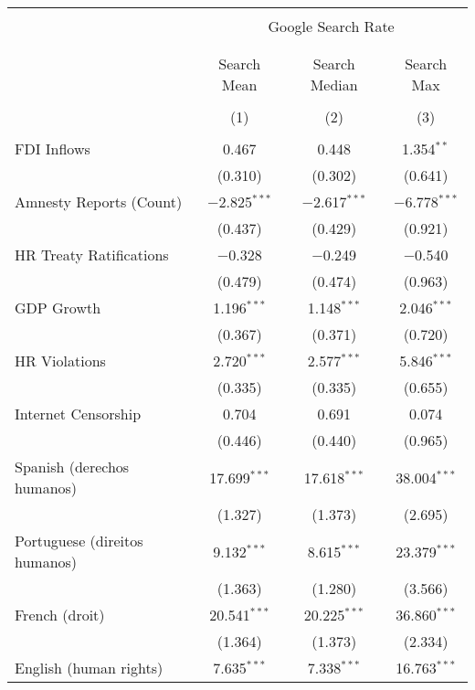 
\begin{table}[!htbp] \centering 
  \caption{} 
  \label{} 
\begin{tabular}{@{\extracolsep{5pt}}lccc} 
\\[-1.8ex]\hline 
\hline \\[-1.8ex] 
 & \multicolumn{3}{c}{Google Search Rate} \\ 
\cline{2-4} 
\\[-1.8ex] & \multicolumn{3}{c}{ } \\ 
 & Search Mean & Search Median & Search Max \\ 
\\[-1.8ex] & (1) & (2) & (3)\\ 
\hline \\[-1.8ex] 
 FDI Inflows & 0.467 & 0.448 & 1.354$^{**}$ \\ 
  & (0.310) & (0.302) & (0.641) \\ 
  Amnesty Reports (Count) & $-$2.825$^{***}$ & $-$2.617$^{***}$ & $-$6.778$^{***}$ \\ 
  & (0.437) & (0.429) & (0.921) \\ 
  HR Treaty Ratifications & $-$0.328 & $-$0.249 & $-$0.540 \\ 
  & (0.479) & (0.474) & (0.963) \\ 
  GDP Growth & 1.196$^{***}$ & 1.148$^{***}$ & 2.046$^{***}$ \\ 
  & (0.367) & (0.371) & (0.720) \\ 
  HR Violations & 2.720$^{***}$ & 2.577$^{***}$ & 5.846$^{***}$ \\ 
  & (0.335) & (0.335) & (0.655) \\ 
  Internet Censorship & 0.704 & 0.691 & 0.074 \\ 
  & (0.446) & (0.440) & (0.965) \\ 
  Spanish (derechos humanos) & 17.699$^{***}$ & 17.618$^{***}$ & 38.004$^{***}$ \\ 
  & (1.327) & (1.373) & (2.695) \\ 
  Portuguese (direitos humanos) & 9.132$^{***}$ & 8.615$^{***}$ & 23.379$^{***}$ \\ 
  & (1.363) & (1.280) & (3.566) \\ 
  French (droit) & 20.541$^{***}$ & 20.225$^{***}$ & 36.860$^{***}$ \\ 
  & (1.364) & (1.373) & (2.334) \\ 
  English (human rights) & 7.635$^{***}$ & 7.338$^{***}$ & 16.763$^{***}$ \\ 

\end{tabular}
\end{table}
